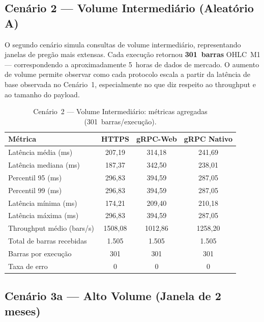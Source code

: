 \subsection{Cenário 2 — Volume Intermediário (Aleatório A)}
\label{sec:cenario2}

O segundo cenário simula consultas de volume intermediário, representando janelas de pregão mais extensas. Cada execução retornou \textbf{301~barras} OHLC~M1 — correspondendo a aproximadamente 5~horas de dados de mercado. O aumento de volume permite observar como cada protocolo escala a partir da latência de base observada no Cenário~1, especialmente no que diz respeito ao throughput e ao tamanho do payload.

\begin{table}[H]
  \centering
  \caption{Cenário~2 — Volume Intermediário: métricas agregadas
    (301~barras/execução).}
  \label{tab:cenario2-summary}
  \begin{tabular}{l S[table-format=4.2] S[table-format=4.2] S[table-format=4.2]}
    \toprule
    \textbf{Métrica} & {\textbf{HTTPS}} & {\textbf{gRPC-Web}} & {\textbf{gRPC Nativo}} \\
    \midrule
    Latência média (ms)        & 207,19  & 314,18  & 241,69  \\
    Latência mediana (ms)      & 187,37  & 342,50  & 238,01  \\
    Percentil 95 (ms)          & 296,83  & 394,59  & 287,05  \\
    Percentil 99 (ms)          & 296,83  & 394,59  & 287,05  \\
    Latência mínima (ms)       & 174,21  & 209,40  & 210,18  \\
    Latência máxima (ms)       & 296,83  & 394,59  & 287,05  \\
    Throughput médio (bars/s)  & 1508,08 & 1012,86 & 1258,20 \\
    Total de barras recebidas  & {1.505}    & {1.505}    & {1.505}    \\
    Barras por execução        & {301}     & {301}     & {301}     \\
    Taxa de erro               & {0}       & {0}       & {0}       \\
    \bottomrule
  \end{tabular}
\end{table}

\subsection{Cenário 3a — Alto Volume (Janela de 2 meses)}
\label{sec:cenario3a}

